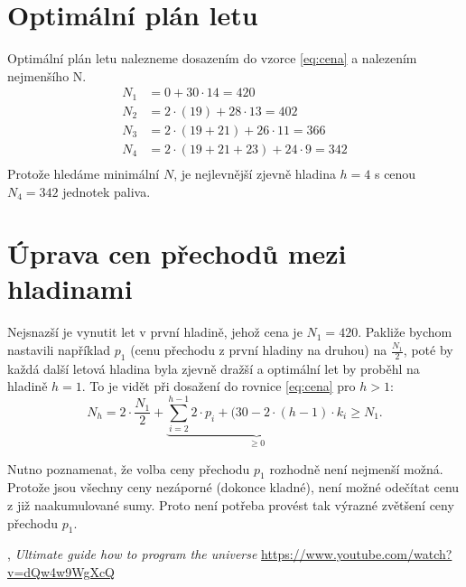 \documentclass[twoside]{article}
\begin{document}
\section{Optimální plán letu}
Optimální plán letu nalezneme dosazením do vzorce \eqref{eq:cena} a nalezením nejmenšího N.
\begin{equation}
	\begin{split}
		N_1 &= 0 + 30 \cdot 14 = 420 \\
		N_2 &= 2 \cdot (19) + 28 \cdot 13 = 402 \\
		N_3 &= 2 \cdot (19 + 21) + 26 \cdot 11 = 366 \\
		N_4 &= 2 \cdot (19 + 21 + 23) + 24 \cdot 9 = 342 \\
	\end{split}
\end{equation}
Protože hledáme minimální $N$, je nejlevnější zjevně hladina $h = 4$ s cenou $N_4 = 342$ jednotek paliva.

\section{Úprava cen přechodů mezi hladinami}
Nejsnazší je vynutit let v první hladině, jehož cena je $N_1 = 420$. Pakliže bychom nastavili například $p_1$ (cenu přechodu z první hladiny na druhou)
na $\frac{N_1}{2}$, poté by každá další letová hladina byla zjevně dražší a optimální let by proběhl na hladině $h = 1$. To je vidět při dosažení do rovnice \eqref{eq:cena} pro $h>1$:
\begin{equation*}
	N_h = 2\cdot \frac{N_1}{2} + \underbrace{\sum_{i=2}^{h-1} 2 \cdot p_i + (30 - 2\cdot (h-1) \cdot {k_i}}_{\ge 0} \ge N_1.
\end{equation*}

Nutno poznamenat, že volba ceny přechodu $p_1$ rozhodně není nejmenší možná. Protože jsou všechny ceny nezáporné (dokonce kladné), není možné
odečítat cenu z již naakumulované sumy. Proto není potřeba provést tak výrazné zvětšení ceny přechodu $p_1$.
\begin{thebibliography}{9}

	, \emph{Ultimate guide how to program the universe} \url{https://www.youtube.com/watch?v=dQw4w9WgXcQ}
\end{thebibliography}
\end{document}
